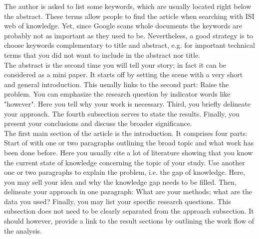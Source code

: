 \documentclass[justified, notoc]{tufte-book} %
\begin{document}
The author is asked to list some keywords, which are usually located right below the abstract. These terms allow people to find the article when searching with ISI web of knowledge. Yet, since Google scans whole documents the keywords are probably not as important as they used to be. Nevertheless, a good strategy is to choose keywords complementary to title and abstract, e.g. for important technical terms that you
did not want to include in the abstract nor title.\\

The abstract is the second time you will tell your story; in fact it can be considered as a mini paper. It starts off by setting the scene with a very short and general introduction. This usually links to the second part: Raise the problem. You can emphasize the research question by indicator words like "however". Here you tell why your work is necessary. Third, you briefly delineate your approach. The fourth subsection serves to state the results. Finally, you present your conclusions and discuss the broader significance.\\

The first main section of the article is the introduction. It comprises four parts: Start of with one or two paragraphs outlining the broad topic and what work has been done before. Here you usually cite a lot of literature showing that you know the current state of knowledge concerning the topic of your study.
Use another one or two paragraphs to explain the problem, i.e. the gap of knowledge. Here, you may sell your idea and why the knowledge gap needs to be filled.
Then, delineate your approach in one paragraph: What are your methods; what are the data you used?
Finally, you may list your specific research questions. This subsection does not need to be clearly separated from the approach subsection. It should however, provide a link to the result sections by outlining the work flow of the analysis.\\
\end{document}
